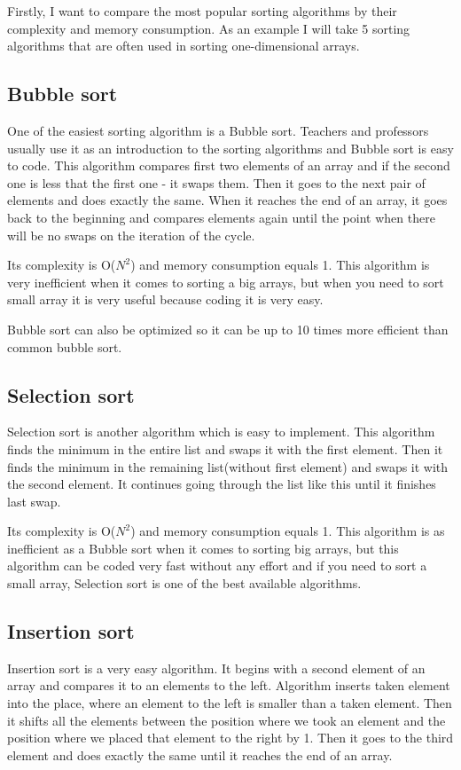\documentclass[12pt,oneside,a4paper]{article}
\begin{document}
Firstly, I want to compare the most popular sorting algorithms by their complexity and memory consumption. As an example I will take 5 sorting algorithms that are often used in sorting one-dimensional arrays.

\subsection{Bubble sort}
One of the easiest sorting algorithm is a Bubble sort. Teachers and professors usually use it as an introduction to the sorting algorithms and Bubble sort is easy to code. This algorithm compares first two elements of an array and if the second one is less that the first one - it swaps them. Then it goes to the next pair of elements and does exactly the same. When it reaches the end of an array, it goes back to the beginning and compares elements again until the point when there will be no swaps on the iteration of the cycle. 

Its complexity is O($N^{2}$) and memory consumption equals 1. This algorithm is very inefficient when it comes to sorting a big arrays, but when you need to sort small array it is very useful because coding it is very easy. 

Bubble sort can also be optimized so it can be up to 10 times more efficient than common bubble sort.\cite{bubble}

\subsection{Selection sort}
Selection sort is another algorithm which is easy to implement. This algorithm finds the minimum in the entire list and swaps it with the first element. Then it finds the minimum in the remaining list(without first element) and swaps it with the second element. It continues going through the list like this until it finishes last swap. 

Its complexity is O($N^{2}$) and memory consumption equals 1. This algorithm is as inefficient as a Bubble sort when it comes to sorting big arrays, but this algorithm can be coded very fast without any effort and if you need to sort a small array, Selection sort is one of the best available algorithms. 

\subsection{Insertion sort}

Insertion sort is a very easy algorithm. It begins with a second element of an array and compares it to an elements to the left. Algorithm inserts taken element into the place, where an element to the left is smaller than a taken element. Then it shifts all the elements between the position where we took an element and the position where we placed that element to the right by 1. Then it goes to the third element and does exactly the same until it reaches the end of an array. 
\end{document}

